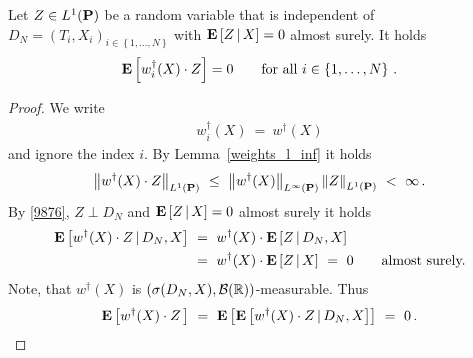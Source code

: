 \begin{lemma}
  \label{w.Z=0}
 Let 
 $Z\in L^1(\P)$
  be a random variable that is independent of $D_N=(T_i,X_i)_{i\in \left\{
    1,\ldots,N
  \right\}}$ 
  with
  $
\E
\left[
  Z
  \,
  |
  \, 
  X
\right]
= 0
  $
  almost surely.
  It holds
  \begin{gather*}
  \E
  \left[
    w_i^\dagger(X)
  \cdot Z
  \right]
  =0
  \qquad
  \text{for all}
  \ 
  i\in \left\{ 1,\ldots,N \right\}
  \,.
  \end{gather*}
\end{lemma}
\begin{proof}
  We write
  \begin{gather*}
    w_i^\dagger(X)
  \ 
  =
  \ 
  w^\dagger(X)
  \end{gather*}
  and ignore the index $i$.
  By Lemma~\ref{weights_l_inf} it holds
  \begin{gather}
    \label{9876}
    \norm{
  w^\dagger(X)\cdot Z
    }_{L^1(\P)}
    \ 
  \le
    \ 
  \norm{w^\dagger(X)}_{L^\infty(\P)}
  \norm{Z}_{L^1(\P)}
  \ 
  <
  \ 
  \infty
  \,.
  \end{gather}
  By 
  \eqref{9876},
  $Z\perp D_N$
  and
  $
\E
\left[
  Z
  \,
  |
  \, 
  X
\right]
= 0
  $
  almost surely
  it holds 
  \begin{align*}
    \E
  \left[
  w^\dagger(X)
  \cdot
  Z
  \,
  |
  \,
  D_N,X
  \right]
  &
  \ 
  =
  \ 
  w^\dagger(X)
  \cdot
  \E
  \left[
  Z
  \,
  |
  \,
  D_N,X
  \right]
  \\
  &
  \ 
  =
  \ 
  w^\dagger(X)
  \cdot
  \E
  \left[
  Z
  \,
  |
  \,
  X
  \right]
  \
  =
  \ 
  0
  \qquad
  \text{almost surely.}
  \end{align*}
  Note, that $w^\dagger(X)$ is 
  $
  \left(
  \sigma(D_N,X),\mathcal{B}(\R)
  \right)
  $-measurable.  
  Thus
  \begin{gather*}
    \E
    \left[
  w^\dagger(X)
  \cdot
  Z
  \,
    \right]
    \ 
    =
    \ 
    \E
    \left[
 \E
  \left[
  w^\dagger(X)
  \cdot
  Z
  \,
  |
  \,
  D_N,X
  \right]
    \right]
    \ 
    =
    \ 
    0
    \,.
     \end{gather*}
\end{proof}

